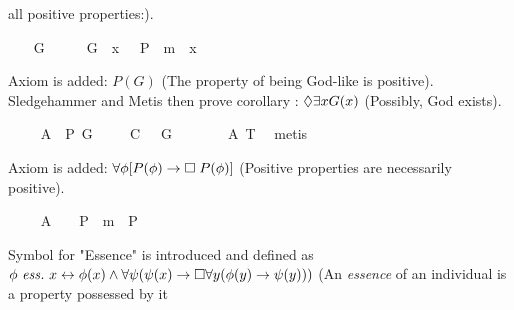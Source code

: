 \begin{isabellebody}
\begin{isamarkuptext}
all positive properties:).%
\end{isamarkuptext}%
\isamarkuptrue%
\ \ \isamarkupfalse%
\ G\ {\isacharcolon}{\isacharcolon}\ {\isachardoublequoteopen}{\isasymmu}\ {\isasymRightarrow}\ {\isasymsigma}{\isachardoublequoteclose}\ \ {\isachardoublequoteopen}G\ {\isacharequal}\ {\isacharparenleft}{\isasymlambda}x{\isachardot}\ {\isasymPi}\ {\isacharparenleft}{\isasymlambda}{\isasymPhi}{\isachardot}\ P\ {\isasymPhi}\ m{\isasymRightarrow}\ {\isasymPhi}\ x{\isacharparenright}{\isacharparenright}{\isachardoublequoteclose}%
\begin{isamarkuptext}%
Axiom  is added: $P(G)$ (The property of being God-like is positive).
Sledgehammer and Metis then prove corollary : $\Diamond \exists x G(x)$ 
(Possibly, God exists).%
\end{isamarkuptext}%
\isamarkuptrue%
\ \ \isamarkupfalse%
\ \ A{}{\isacharcolon}\ \ {\isachardoublequoteopen}{\isacharbrackleft}P\ G{\isacharbrackright}{\isachardoublequoteclose}\ \isanewline
\isanewline
\ \ \isamarkupfalse%
\ C{\isacharcolon}\ {\isachardoublequoteopen}{\isacharbrackleft}{\isasymdiamond}\ {\isacharparenleft}{\isasymexists}\ G{\isacharparenright}{\isacharbrackright}{\isachardoublequoteclose}\ \isanewline
\ \ \isanewline
%
\isadelimproof
\ \ %
\endisadelimproof
%
\isatagproof
{}\isamarkupfalse%
\ A{}\ T{}\ \isamarkupfalse%
\ metis%
\endisatagproof
{\isafoldproof}%
%
\isadelimproof
%
\endisadelimproof
%
\begin{isamarkuptext}%
Axiom  is added: $\forall \phi [P(\phi) \to \Box \; P(\phi)]$ 
(Positive properties are necessarily positive).%
\end{isamarkuptext}%
\isamarkuptrue%
\ \ \isamarkupfalse%
\ \ A{}{\isacharcolon}\ \ {\isachardoublequoteopen}{\isacharbrackleft}{\isasymPi}\ {\isacharparenleft}{\isasymlambda}{\isasymPhi}{\isachardot}\ P\ {\isasymPhi}\ m{\isasymRightarrow}\ {\isasymbox}\ {\isacharparenleft}P\ {\isasymPhi}{\isacharparenright}{\isacharparenright}{\isacharbrackright}{\isachardoublequoteclose}%
\begin{isamarkuptext}%
Symbol  for "Essence" is introduced and defined as 
$\phi \ \mathit{ess.} \ x \leftrightarrow \phi(x) \wedge \forall \psi (\psi(x) \rightarrow \Box \forall y (\phi(y) 
\rightarrow \psi(y)))$ (An \emph{essence} of an individual is a property possessed by it 

\end{isamarkuptext}
\end{isabellebody}
